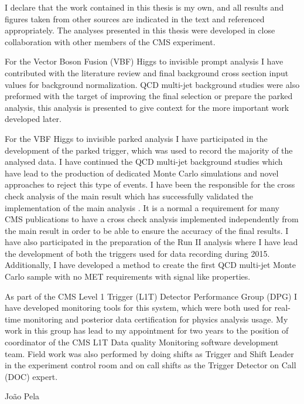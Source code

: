 \begin{declaration}
I declare that the work contained in this thesis is my own, and all results and figures taken from other sources are indicated in the text and referenced appropriately. The analyses presented in this thesis were developed in close collaboration with other members of the CMS experiment.

For the Vector Boson Fusion (VBF) Higgs to invisible prompt analysis I have contributed with the literature review and final background cross section input values for background normalization. QCD multi-jet background studies were also preformed with the target of improving the final selection or prepare the parked analysis, this analysis is presented to give context for the more important work developed later. 

For the VBF Higgs to invisible parked analysis I have participated in the development of the parked trigger, which was used to record the majority of the analysed data. I have continued the QCD multi-jet background studies which have lead to the production of dedicated Monte Carlo simulations and novel approaches to reject this type of events. I have been the responsible for the cross check analysis of the main result which has successfully validated the implementation of the main analysis \cite{ARTICLE:CMSVBFHiggsInvisibleParkedAnalysisPAS}. It is a normal a requirement for many \gls{CMS} publications to have a cross check analysis implemented independently from the main result in order to be able to ensure the accuracy of the final results. I have also participated in the preparation of the Run II analysis where I have lead the development of both the triggers used for data recording during 2015. Additionally, I have developed a method to create the first QCD multi-jet Monte Carlo sample with no MET requirements with signal like properties.

As part of the CMS Level 1 Trigger (L1T) Detector Performance Group (DPG) I have developed monitoring tools for this system, which were both used for real-time monitoring and posterior data certification for physics analysis usage. My work in this group has lead to my appointment for two years to the position of coordinator of the \gls{CMS} \gls{L1T} Data quality Monitoring software development team. Field work was also performed by doing shifts as Trigger and Shift Leader in the experiment control room and on call shifts as the Trigger Detector on Call (DOC) expert.
 
\vspace*{1cm}
\begin{flushright}
João Pela
\end{flushright}
\end{declaration}

